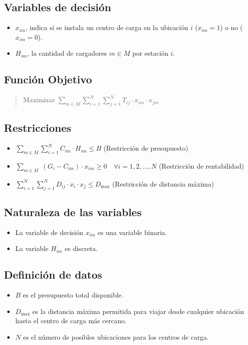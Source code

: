 \documentclass[letterpaper]{article}
\begin{document}
\begin{flushleft}
		\subsection{Variables de decisión} 
		\begin{itemize}
			\item $x_{im}$, indica si se instala un centro de carga en la ubicación $i$ ($x_{im} = 1$) o no ($x_{im} = 0$).
			\item $H_{im}$, la cantidad de cargadores $m \in M$ por estación $i$.

		\end{itemize}
		\subsection{Función Objetivo}
		\begin{quote}
			\begin{center}
				Maximizar $\sum_{m \in M} \sum_{i=1}^{N}\sum_{j=1}^{N} T_{ij} \cdot x_{im} \cdot x_{jm}$
			\end{center}
		\end{quote}
		\subsection{Restricciones}
		\begin{itemize}
			\item $\sum_{m \in M} \sum_{i=1}^{N} C_{im} \cdot H_{im} \leq B$ (Restricción de presupuesto)
			\item $\sum_{m \in M} \; (G_i - C_{im}) \cdot x_{im} \geq 0 \quad \forall i=1,2,\ldots,N$ (Restricción de rentabilidad)
			\item $\sum_{i=1}^{N} \sum_{j=1}^{N} D_{ij} \cdot x_i \cdot x_j \leq D_{\text{max}}$ (Restricción de distancia máxima)
		\end{itemize}
		\subsection{Naturaleza de las variables}
		\begin{itemize}
			\item La variable de decisión $x_{im}$ es una variable binaria.
			\item La variable $H_{im}$ es discreta. 
		\end{itemize}
		\subsection{Definición de datos}
		\begin{itemize}
			\item $B$ es el presupuesto total disponible.
			\item $D_{\text{max}}$ es la distancia máxima permitida para viajar desde cualquier ubicación hasta el centro de carga más cercano.
			\item $N$ es el número de posibles ubicaciones para los centros de carga.
		\end{itemize}
		
	\end{flushleft}
	
\end{document}
